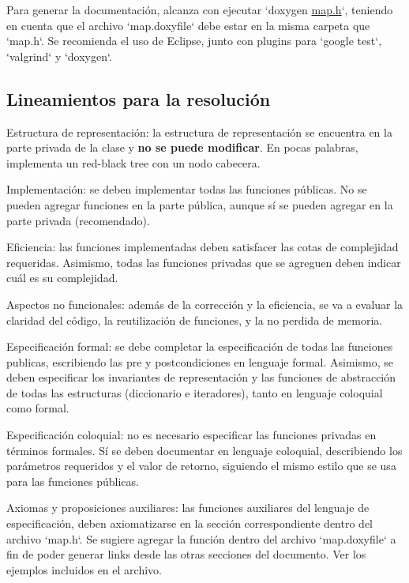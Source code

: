 \-Para generar la documentación, alcanza con ejecutar `doxygen \hyperlink{map_8h}{map.\-h}`, teniendo en cuenta que el archivo `map.doxyfile` debe estar en la misma carpeta que `map.h`. \-Se recomienda el uso de \-Eclipse, junto con plugins para `google test`, `valgrind` y `doxygen`.\hypertarget{Enunciado_enun-lineamiento}{}\subsection{\-Lineamientos para la resolución}\label{Enunciado_enun-lineamiento}

\begin{DoxyItemize}
\item \-Estructura de representación\-: la estructura de representación se encuentra en la parte privada de la clase y {\bfseries no se puede modificar}. \-En pocas palabras, implementa un red-\/black tree con un nodo cabecera.
\item \-Implementación\-: se deben implementar todas las funciones públicas. \-No se pueden agregar funciones en la parte pública, aunque sí se pueden agregar en la parte privada (recomendado).
\item \-Eficiencia\-: las funciones implementadas deben satisfacer las cotas de complejidad requeridas. \-Asimismo, todas las funciones privadas que se agreguen deben indicar cuál es su complejidad.
\item \-Aspectos no funcionales\-: además de la corrección y la eficiencia, se va a evaluar la claridad del código, la reutilización de funciones, y la no perdida de memoria.
\item \-Especificación formal\-: se debe completar la especificación de todas las funciones publicas, escribiendo las pre y postcondiciones en lenguaje formal. \-Asimismo, se deben especificar los invariantes de representación y las funciones de abstracción de todas las estructuras (diccionario e iteradores), tanto en lenguaje coloquial como formal.
\item \-Especificación coloquial\-: no es necesario especificar las funciones privadas en términos formales. \-Sí se deben documentar en lenguaje coloquial, describiendo los parámetros requeridos y el valor de retorno, siguiendo el mismo estilo que se usa para las funciones públicas.
\item \-Axiomas y proposiciones auxiliares\-: las funciones auxiliares del lenguaje de especificación, deben axiomatizarse en la sección correspondiente dentro del archivo `map.h`. \-Se sugiere agregar la función dentro del archivo `map.doxyfile` a fin de poder generar links desde las otras secciones del documento. \-Ver los ejemplos incluidos en el archivo.

\end{DoxyItemize}
